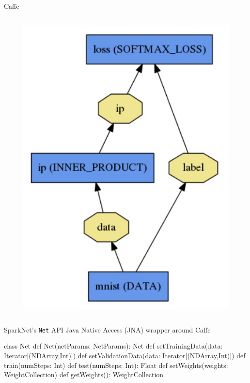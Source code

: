 \documentclass[pdf]{beamer}
\begin{document}
\begin{frame}[fragile]{Caffe \cite{jia2014caffe}}
\begin{columns}
\begin{column}{0.35\textwidth}
\begin{figure}[htpb]
                \includegraphics[width=\linewidth]{Figures/logreg}
            \end{figure}
        \end{column}
    \end{columns}
\end{frame}

\begin{frame}[fragile]{SparkNet's \texttt{Net} API}
    Java Native Access (JNA) wrapper around Caffe

    \begin{scalacode}
class Net {
    def Net(netParams: NetParams): Net
    def setTrainingData(data: Iterator[(NDArray,Int)])
    def setValidationData(data: Iterator[(NDArray,Int)])
    def train(numSteps: Int)
    def test(numSteps: Int): Float
    def setWeights(weights: WeightCollection)
    def getWeights(): WeightCollection
}
    \end{scalacode}
\end{frame}
\end{document}
